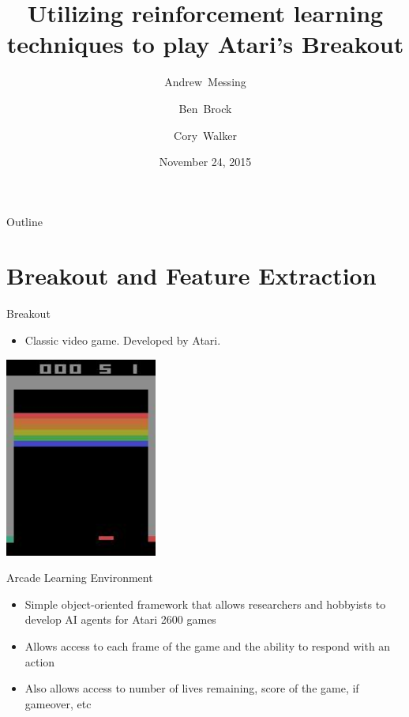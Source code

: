 \documentclass{beamer}
\title{Utilizing reinforcement learning techniques to play Atari's Breakout}
\author{Andrew~Messing \and Ben~Brock \and Cory~Walker}
\date{November 24, 2015}
\begin{document}
\begin{frame}
  \titlepage
\end{frame}

\begin{frame}{Outline}
  \tableofcontents
\end{frame}


\section{Breakout and Feature Extraction}
\begin{frame}{Breakout}
  \begin{itemize}
    \item Classic video game.  Developed by Atari.
  \end{itemize}
  \begin{center}
  \includegraphics[width=50mm]{tmp.jpg}
  \end{center}
\end{frame}

\begin{frame}{Arcade Learning Environment}
  \begin{itemize}
    \item Simple object-oriented framework that allows researchers and hobbyists to develop AI agents for Atari 2600 games
    \item Allows access to each frame of the game and the ability to respond with an action
    \item Also allows access to number of lives remaining, score of the game, if gameover, etc
  \end{itemize}
\end{frame}
\end{document}
